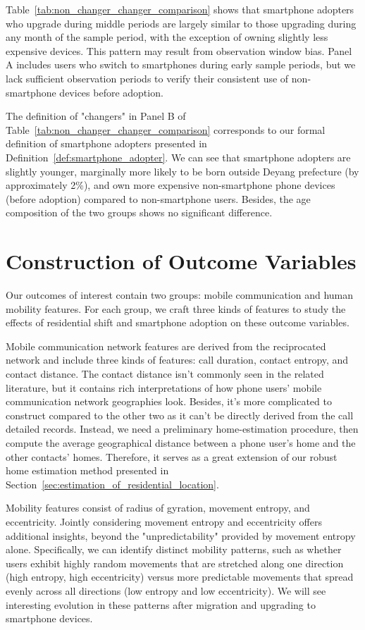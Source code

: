 \clearpage\newpage
Table~\ref{tab:non_changer_changer_comparison} shows that smartphone adopters who upgrade during middle periods are largely similar to those upgrading during any month of the sample period, with the exception of owning slightly less expensive devices.
This pattern may result from observation window bias.
Panel A includes users who switch to smartphones during early sample periods, but we lack sufficient observation periods to verify their consistent use of non-smartphone devices before adoption.

The definition of "changers" in Panel B of Table~\ref{tab:non_changer_changer_comparison} corresponds to our  formal definition of smartphone adopters presented in Definition~\ref{def:smartphone_adopter}.
We can see that smartphone adopters are slightly younger, marginally more likely to be born outside Deyang prefecture (by approximately 2\%), and own more expensive non-smartphone phone devices (before adoption) compared to non-smartphone users.
Besides, the age composition of the two groups shows no significant difference.

\clearpage\newpage
\section{Construction of Outcome Variables}
Our outcomes of interest contain two groups: mobile communication and human mobility features.
For each group, we craft three kinds of features to study the effects of residential shift and smartphone adoption on these outcome variables.

Mobile communication network features are derived from the reciprocated network and include three kinds of features: call duration, contact entropy, and contact distance.
The contact distance isn't commonly seen in the related literature, but it contains rich interpretations of how phone users' mobile communication network geographies look. Besides, it's more complicated to construct compared to the other two as it can't be directly derived from the call detailed records.
Instead, we need a preliminary home-estimation procedure, then compute the average geographical distance between a phone user's home and the other contacts' homes.
Therefore, it serves as a great extension of our robust home estimation method presented in Section~\ref{sec:estimation_of_residential_location}.

Mobility features consist of radius of gyration, movement entropy, and eccentricity. Jointly considering movement entropy and eccentricity offers additional insights, beyond the "unpredictability" provided by movement entropy alone. Specifically, we can identify distinct mobility patterns, such as whether users exhibit highly random movements that are stretched along one direction (high entropy, high eccentricity) versus more predictable movements that spread evenly across all directions (low entropy and low eccentricity). We will see interesting evolution in these patterns after migration and upgrading to smartphone devices.

